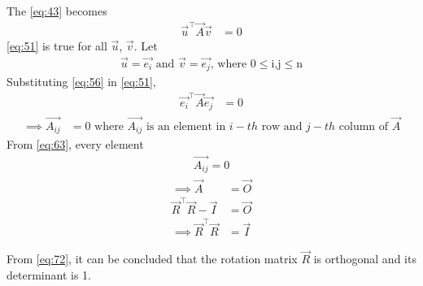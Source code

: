 \documentclass[journal]{IEEEtran}
\begin{document}
The \eqref{eq:43} becomes
\begin{align}
    \vec{u}^\top\vec{A}\vec{v} &= 0 \label{eq:51}
\end{align}
\eqref{eq:51} is true for all $\vec{u}$, $\vec{v}$.
Let
\begin{align}
    \vec{u} = \vec{e_i}\text{ and }\vec{v} = \vec{e_j}\text{, where 0$\leq$i,j$\leq$n} \label{eq:56}
\end{align}
Substituting \eqref{eq:56} in \eqref{eq:51},
\begin{align}
    \vec{e_i}^\top\vec{A}\vec{e_j} &= 0
\end{align}
\begin{align}
    \implies \vec{A_{ij}} &= 0\text{ where $\vec{A_{ij}}$ is an element in $i-th$ row and $j-th$ column of $\vec{A}$} \label{eq:63}
\end{align}
From \eqref{eq:63}, every element 
\begin{align}
    \vec{A_{ij}} = 0
\end{align}
\begin{align}
    \implies \vec{A} &= \vec{O} \\
    \vec{R}^\top\vec{R} - \vec{I} &= \vec{O} \\
    \implies \vec{R}^\top\vec{R} &= \vec{I} \label{eq:72}
\end{align}

From \eqref{eq:72}, it can be concluded that the rotation matrix $\vec{R}$ is orthogonal and its determinant is 1.
\end{document}

